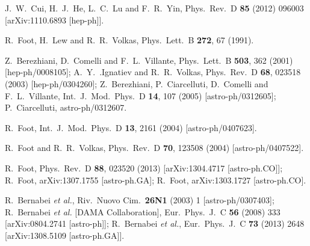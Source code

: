 \documentclass[12pt]{article}
\begin{document}
{{\begin{thebibliography}{999}
  J.~W.~Cui, H.~J.~He, L.~C.~Lu and F.~R.~Yin,
  Phys.\ Rev.\ D {\bf 85} (2012) 096003
  [arXiv:1110.6893 [hep-ph]].
  
  R.~Foot, H.~Lew and R.~R.~Volkas,
  Phys.\ Lett.\ B {\bf 272}, 67 (1991).
  
  Z.~Berezhiani, D.~Comelli and F.~L.~Villante,
  Phys.\ Lett.\ B {\bf 503}, 362 (2001)
  [hep-ph/0008105];
  A.~Y.~.Ignatiev and R.~R.~Volkas,
  Phys.\ Rev.\ D {\bf 68}, 023518 (2003)
  [hep-ph/0304260];
  Z.~Berezhiani, P.~Ciarcelluti, D.~Comelli and F.~L.~Villante,
  Int.\ J.\ Mod.\ Phys.\ D {\bf 14}, 107 (2005)
  [astro-ph/0312605];
  P.~Ciarcelluti,
  astro-ph/0312607.
  
  R.~Foot,
  Int.\ J.\ Mod.\ Phys.\ D {\bf 13}, 2161 (2004)
  [astro-ph/0407623].
  
  R.~Foot and R.~R.~Volkas,
  Phys.\ Rev.\ D {\bf 70}, 123508 (2004)
  [astro-ph/0407522].

  R.~Foot,
  Phys.\ Rev.\ D {\bf 88}, 023520 (2013)
  [arXiv:1304.4717 [astro-ph.CO]];
  R.~Foot,
  arXiv:1307.1755 [astro-ph.GA];
  R.~Foot,
  arXiv:1303.1727 [astro-ph.CO].
  
  R.~Bernabei {\it et al.},
  Riv.\ Nuovo Cim.\  {\bf 26N1} (2003) 1
  [astro-ph/0307403];
  R.~Bernabei {\it et al.}  [DAMA Collaboration],
  Eur.\ Phys.\ J.\ C {\bf 56} (2008) 333
  [arXiv:0804.2741 [astro-ph]];
  R.~Bernabei {\it et al.},
  Eur.\ Phys.\ J.\ C {\bf 73} (2013) 2648
  [arXiv:1308.5109 [astro-ph.GA]].
  

\end{thebibliography}}}
\end{document}
